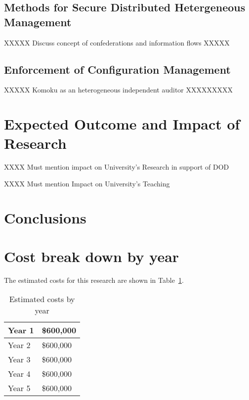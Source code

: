 \documentclass[10pt]{article}
\begin{document}
\subsection{Methods for Secure Distributed Hetergeneous Management}

XXXXX Discuss concept of confederations and information flows XXXXX

\subsection{Enforcement of Configuration Management}

XXXXX Komoku as an heterogeneous independent auditor XXXXXXXXX

\section{Expected Outcome and Impact of Research}

XXXX Must mention impact on University's Research in support of DOD

XXXX Must mention Impact on University's Teaching

\section{Conclusions}

\appendix

\section{Cost break down by year}
The estimated costs for this research are shown in
Table~\ref{table:costs}.

\begin{table}
\begin{center}
\begin{tabular}{|l|l|}
\hline
Year 1 & \$600,000 \\ \hline
Year 2 & \$600,000 \\ \hline
Year 3 & \$600,000 \\ \hline
Year 4 & \$600,000 \\ \hline
Year 5 & \$600,000 \\ \hline
\end{tabular}
\end{center}
\label{table:costs}
\caption{Estimated costs by year}
\end{table}




\end{document}
